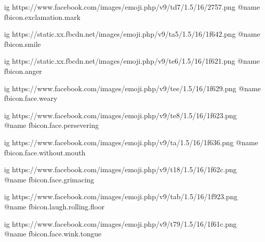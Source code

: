  
 
 
 
 

\ifcmt




  ig https://www.facebook.com/images/emoji.php/v9/td7/1.5/16/2757.png
  @name fbicon.exclamation.mark

  ig https://static.xx.fbcdn.net/images/emoji.php/v9/ta5/1.5/16/1f642.png
  @name fbicon.smile

  ig https://static.xx.fbcdn.net/images/emoji.php/v9/te6/1.5/16/1f621.png
  @name fbicon.anger

  ig https://www.facebook.com/images/emoji.php/v9/tee/1.5/16/1f629.png
  @name fbicon.face.weary

  ig https://www.facebook.com/images/emoji.php/v9/te8/1.5/16/1f623.png
  @name fbicon.face.persevering

  ig https://www.facebook.com/images/emoji.php/v9/ta/1.5/16/1f636.png
  @name fbicon.face.without.mouth

  ig https://www.facebook.com/images/emoji.php/v9/t18/1.5/16/1f62c.png
  @name fbicon.face.grimacing

	ig https://www.facebook.com/images/emoji.php/v9/tab/1.5/16/1f923.png
  @name fbicon.laugh.rolling.floor

	ig https://www.facebook.com/images/emoji.php/v9/t79/1.5/16/1f61c.png
  @name fbicon.face.wink.tongue

\fi
